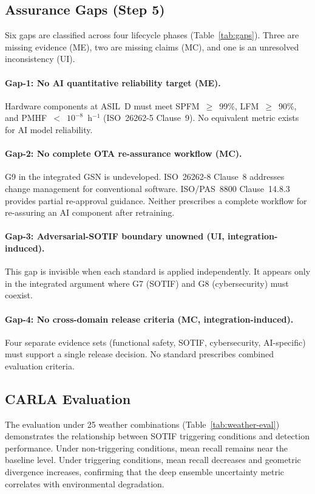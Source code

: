 \subsection{Assurance Gaps (Step 5)}

Six gaps are classified across four lifecycle phases
(Table~\ref{tab:gaps}). Three are missing evidence (ME), two are missing
claims (MC), and one is an unresolved inconsistency (UI).

\paragraph{Gap-1: No AI quantitative reliability target (ME).}
Hardware components at ASIL~D must meet SPFM~$\geq$~99\%,
LFM~$\geq$~90\%, and PMHF~$<$~$10^{-8}$~h$^{-1}$ (ISO~26262-5
Clause~9). No equivalent metric exists for AI model reliability.

\paragraph{Gap-2: No complete OTA re-assurance workflow (MC).}
G9 in the integrated GSN is undeveloped. ISO~26262-8 Clause~8 addresses
change management for conventional software. ISO/PAS~8800 Clause~14.8.3
provides partial re-approval guidance. Neither prescribes a complete
workflow for re-assuring an AI component after retraining.

\paragraph{Gap-3: Adversarial-SOTIF boundary unowned (UI, integration-induced).}
This gap is invisible when each standard is applied independently.
It appears only in the integrated argument where G7 (SOTIF) and G8
(cybersecurity) must coexist.

\paragraph{Gap-4: No cross-domain release criteria (MC, integration-induced).}
Four separate evidence sets (functional safety, SOTIF, cybersecurity,
AI-specific) must support a single release decision. No standard
prescribes combined evaluation criteria.

\subsection{CARLA Evaluation}

The evaluation under 25 weather combinations (Table~\ref{tab:weather-eval})
demonstrates the relationship between SOTIF triggering conditions and
detection performance. Under non-triggering conditions, mean recall
remains near the baseline level. Under triggering conditions, mean recall
decreases and geometric divergence increases, confirming that the deep
ensemble uncertainty metric correlates with environmental degradation.

